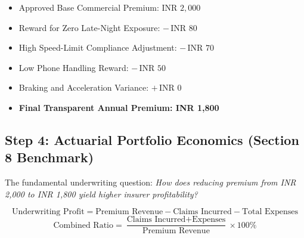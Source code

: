 \documentclass[11pt,a4paper]{article}
\begin{document}
\begin{tcolorbox}[colback=slate!5,colframe=brandblue,title=\textbf{Itemized Policyholder Bill Breakdown}]
\begin{itemize}[noitemsep]
    \item Approved Base Commercial Premium: INR $2,000$
    \item Reward for Zero Late-Night Exposure: $-\,\text{INR } 80$
    \item High Speed-Limit Compliance Adjustment: $-\,\text{INR } 70$
    \item Low Phone Handling Reward: $-\,\text{INR } 50$
    \item Braking and Acceleration Variance: $+\,\text{INR } 0$
    \item \textbf{Final Transparent Annual Premium: INR 1,800}
\end{itemize}
\end{tcolorbox}

\subsection{Step 4: Actuarial Portfolio Economics (Section 8 Benchmark)}
The fundamental underwriting question: \textit{How does reducing premium from INR 2,000 to INR 1,800 yield higher insurer profitability?}

\begin{equation}
    \text{Underwriting Profit} = \text{Premium Revenue} - \text{Claims Incurred} - \text{Total Expenses}
\end{equation}
\begin{equation}
    \text{Combined Ratio} = \frac{\text{Claims Incurred} + \text{Expenses}}{\text{Premium Revenue}} \times 100\%
\end{equation}
\end{document}

